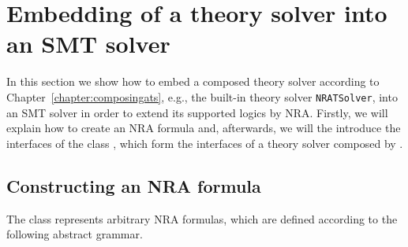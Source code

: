 \chapter{Embedding of a theory solver into an SMT solver}
\label{chapter:embeddingats}
In this section we show how to embed a composed theory solver according
to Chapter~\ref{chapter:composingats}, e.g., the built-in theory 
solver \texttt{NRATSolver}, into an SMT solver in order to 
extend its supported logics by NRA. Firstly, we will explain how to
create an NRA formula and, afterwards, we will the introduce the 
interfaces of the class \managerClass, which form the interfaces of
a theory solver composed by \smtrat.

\section{Constructing an NRA formula}
The class \formulaClass represents arbitrary NRA formulas, which are
defined according to the following abstract grammar.

